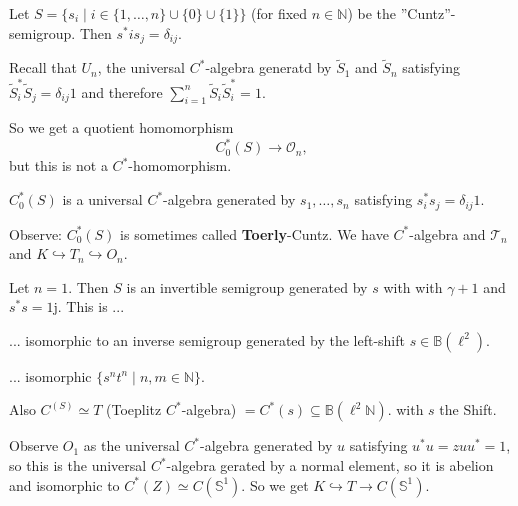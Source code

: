 \documentclass[a4paper]{article}
\begin{document}
\begin{example}
	Let $S = \{s_i \mid i \in \{1, \dots, n\} \cup \{0\} \cup \{1\}\}$ (for fixed $n \in  \mathds{N}$) be the ''Cuntz''-semigroup. Then $s^*i s_j = \delta_{ij}$.

	Recall that $U_n$, the universal $C^*$-algebra generatd by $\tilde{S}_1$ and $\tilde{S}_n$ satisfying $\tilde{S}_i^* \tilde{S}_j = \delta_{ij} 1$ and therefore $\sum_{i = 1}^{n} \tilde{S}_i \tilde{S}_i^* = 1$.

	So we get a quotient homomorphism
	\begin{equation*}
		C_0^*(S) \to \mathcal{O}_n\text{,}
	\end{equation*}
	but this is not a $C^*$-homomorphism.

	$C_0^*(S)$ is a universal $C^*$-algebra generated by $s_1 ,\dots, s_n$ satisfying $s_i^* s_j = \delta_{ij} 1$.

	Observe: $C^*_0(S)$ is sometimes called \textbf{Toerly}-Cuntz.
	We have $C^*$-algebra and $\mathcal{T}_n$ and $K \hookrightarrow T_n \hookrightarrow O_n$.
\end{example}

\begin{example}
	Let $n = 1$.
	Then $S$ is an invertible semigroup generated by $s$ with with $\gamma + 1$ and $s^*s =1$j.
	This is ...

	... isomorphic to an inverse semigroup generated by the left-shift $s \in \mathds{B}(\ell^2)$.

	... isomorphic $\{s^n t^n \mid n,m \in \mathds{N}\}$.

	Also $C^(S) \simeq  T $ (Toeplitz $C^*$-algebra) $= C^*(s) \subseteq \mathds{B}(\ell^2 \mathds{N})$. with $s$ the Shift.

	Observe $O_1$ as the universal $C^*$-algebra generated by $u$ satisfying $u^*u = zuu^* = 1$, so this is the universal $C^*$-algebra gerated by a normal element, so it is abelion and isomorphic to $C^*(Z) \simeq C(\mathds{S}^1)$.
	So we get $K \hookrightarrow T \to C(\mathds{S}^1)$.
\end{example}
\end{document}
